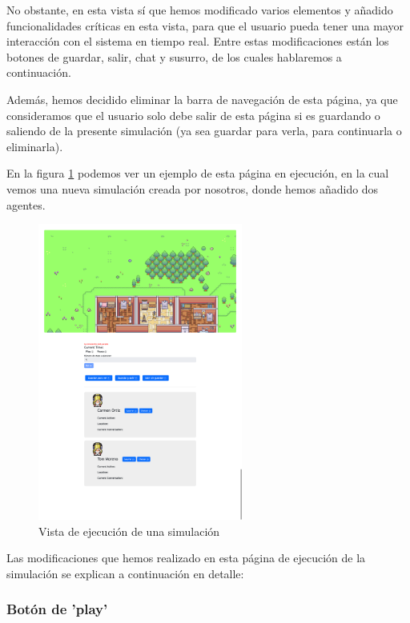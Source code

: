 No obstante, en esta vista sí que hemos modificado varios elementos y añadido funcionalidades críticas en esta vista, para que el usuario pueda tener una mayor interacción con el sistema en tiempo real. Entre estas modificaciones están los botones de guardar, salir, chat y susurro, de los cuales hablaremos a continuación.

Además, hemos decidido eliminar la barra de navegación de esta página, ya que consideramos que el usuario solo debe salir de esta página si es guardando o saliendo de la presente simulación (ya sea guardar para verla, para continuarla o eliminarla).

En la figura \ref{fig:vistaEjecSim} podemos ver un ejemplo de esta página en ejecución, en la cual vemos una nueva simulación creada por nosotros, donde hemos añadido dos agentes.

\begin{figure}[H]
	\centering
	\includegraphics[width = 0.6\textwidth]{Imagenes/Vectorial/ejecucionSimu.png}
	\caption{Vista de ejecución de una simulación}
	\label{fig:vistaEjecSim}
\end{figure}

Las modificaciones que hemos realizado en esta página de ejecución de la simulación se explican a continuación en detalle:

\subsubsection{Botón de 'play'}

